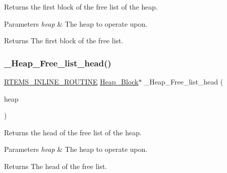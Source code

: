 Returns the first block of the free list of the heap. 


\begin{DoxyParams}{Parameters}
{\em heap} & The heap to operate upon.\\
\hline
\end{DoxyParams}
\begin{DoxyReturn}{Returns}
The first block of the free list. 
\end{DoxyReturn}
\mbox{\label{group__RTEMSScoreHeap_ga860e7959de03ba830d0ebe1b4cca8273}} 
\subsubsection{\texorpdfstring{\_Heap\_Free\_list\_head()}{\_Heap\_Free\_list\_head()}}
{\footnotesize\ttfamily \mbox{\hyperlink{group__RTEMSScoreBaseDefs_gac216239df231d5dbd15e3520b0b9313f}{R\+T\+E\+M\+S\+\_\+\+I\+N\+L\+I\+N\+E\+\_\+\+R\+O\+U\+T\+I\+NE}} \mbox{\hyperlink{structHeap__Block}{Heap\+\_\+\+Block}}$\ast$ \+\_\+\+Heap\+\_\+\+Free\+\_\+list\+\_\+head (\begin{DoxyParamCaption}\item[{\mbox{\hyperlink{structHeap__Control}{Heap\+\_\+\+Control}} $\ast$}]{heap }\end{DoxyParamCaption})}



Returns the head of the free list of the heap. 


\begin{DoxyParams}{Parameters}
{\em heap} & The heap to operate upon.\\
\hline
\end{DoxyParams}
\begin{DoxyReturn}{Returns}
The head of the free list. 
\end{DoxyReturn}
\mbox{\label{group__RTEMSScoreHeap_ga7dd632ea52e7866d26cd025fb154387b}} 
